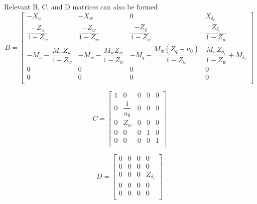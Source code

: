 \documentclass[12pt]{article}
\begin{document}
\noindent Relevant B, C, and D matrices can also be formed
\begin{equation*}
B =
\begin{bmatrix}
-X_u                                          & -X_w                                          & 0                                               & X_{\delta_e} \\
\dfrac{-Z_u}{1-Z_{\dot{w}}}                   & \dfrac{-Z_w}{1-Z_{\dot{w}}}                   & \dfrac{-Z_q}{1-Z_{\dot{w}}}                     & \dfrac{Z_{\delta_e}}{1-Z_{\dot{w}}} \\
-M_u - \dfrac{M_{\dot{w}} Z_u}{1-Z_{\dot{w}}} & -M_w - \dfrac{M_{\dot{w}} Z_w}{1-Z_{\dot{w}}} & -M_q -\dfrac{M_{\dot{w}} (Z_q + u_0)}{1-Z_{\dot{w}}} & \dfrac{M_{\dot{w}} Z_{\delta_e}}{1-Z_{\dot{w}}} + M_{\delta_e} \\


    0   &  0   &  0   & 0 \\
    0   &  0   &  0   & 0 \\
\end{bmatrix}
\end{equation*}

\begin{equation*}
C =
\begin{bmatrix}
    1 & 0     & 0 & 0 & 0\\
    0 & \dfrac{1}{u_0} & 0 & 0 & 0\\
    0 & Z_w   & 0 & 0 & 0\\
    0 & 0     & 0 & 1 & 0\\
    0 & 0     & 0 & 0 & 1\\
\end{bmatrix}
\end{equation*}

\begin{equation*}
D =
\begin{bmatrix}
    0 & 0 & 0 & 0    \\
    0 & 0 & 0 & 0    \\
    0 & 0 & 0 & Z_{\delta_e} \\
    0 & 0 & 0 & 0     \\
    0 & 0 & 0 & 0     \\
\end{bmatrix}
\end{equation*}
\end{document}
